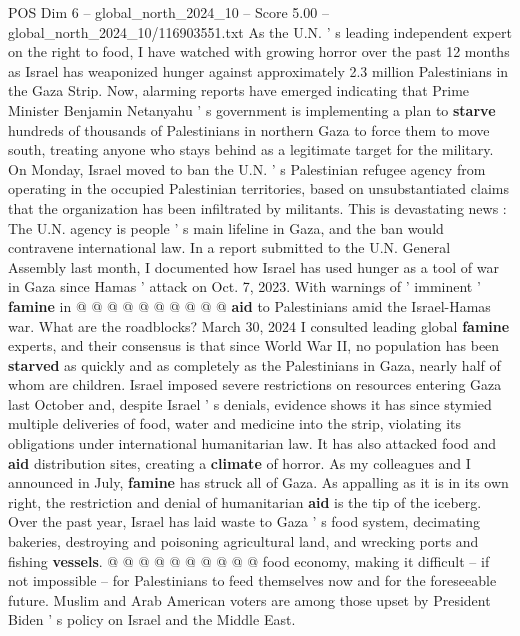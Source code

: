 \begin{textsample}{POS Dim 6 – global\_north\_2024\_10 – Score 5.00 – global\_north\_2024\_10/116903551.txt}  \label{ex:f6_pos_393}
As the U.N. ' s leading independent expert on the right to food, I have watched with growing horror over the past 12 months as Israel has weaponized hunger against approximately 2.3 million Palestinians in the Gaza Strip.
Now, alarming reports have emerged indicating that Prime Minister Benjamin Netanyahu ' s government is implementing a plan to \textbf{starve} hundreds of thousands of Palestinians in northern Gaza to force them to move south, treating anyone who stays behind as a legitimate target for the military.
On Monday, Israel moved to ban the U.N. ' s Palestinian refugee agency from operating in the occupied Palestinian territories, based on unsubstantiated claims that the organization has been infiltrated by militants.
This is devastating news : The U.N. agency is people ' s main lifeline in Gaza, and the ban would contravene international law.
In a report submitted to the U.N.
General Assembly last month, I documented how Israel has used hunger as a tool of war in Gaza since Hamas ' attack on Oct. 7, 2023.
With warnings of ' imminent ' \textbf{famine} in @ @ @ @ @ @ @ @ @ @ \textbf{aid} to Palestinians amid the Israel-Hamas war.
What are the roadblocks?
March 30, 2024 I consulted leading global \textbf{famine} experts, and their consensus is that since World War II, no population has been \textbf{starved} as quickly and as completely as the Palestinians in Gaza, nearly half of whom are children.
Israel imposed severe restrictions on resources entering Gaza last October and, despite Israel ' s denials, evidence shows it has since stymied multiple deliveries of food, water and medicine into the strip, violating its obligations under international humanitarian law.
It has also attacked food and \textbf{aid} distribution sites, creating a \textbf{climate} of horror.
As my colleagues and I announced in July, \textbf{famine} has struck all of Gaza.
As appalling as it is in its own right, the restriction and denial of humanitarian \textbf{aid} is the tip of the iceberg.
Over the past year, Israel has laid waste to Gaza ' s food system, decimating bakeries, destroying and poisoning agricultural land, and wrecking ports and fishing \textbf{vessels}. @ @ @ @ @ @ @ @ @ @ food economy, making it difficult -- if not impossible -- for Palestinians to feed themselves now and for the foreseeable future.
Muslim and Arab American voters are among those upset by President Biden ' s policy on Israel and the Middle East.

\end{textsample}
